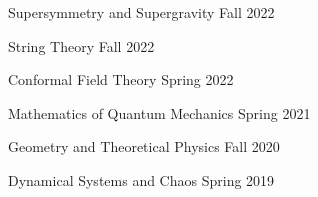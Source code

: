 \begin{multicols}{2}

\begin{cvcourseworks}

    \cvcoursework
      {Supersymmetry and Supergravity} %
      {} %
      {} %
      {Fall 2022} %
  
    \cvcoursework
      {String Theory} %
      {} %
      {} %
      {Fall 2022} %
  
    \cvcoursework
      {Conformal Field Theory} %
      {} %
      {} %
      {Spring 2022} %
  
    \cvcoursework
      {Mathematics of Quantum Mechanics} %
      {} %
      {} %
      {Spring 2021} %
  
    \cvcoursework
      {Geometry and Theoretical Physics} %
      {} %
      {} %
      {Fall 2020} %
  
    \cvcoursework
      {Dynamical Systems and Chaos} %
      {} %
      {} %
      {Spring 2019} %


\end{cvcourseworks}


\end{multicols}

